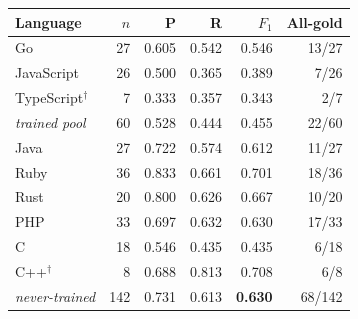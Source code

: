 \begin{tabular}{@{}lrrrrr@{}}
\toprule
Language & $n$ & P & R & $F_1$ & All-gold \\
\midrule
Go                  & 27 & 0.605 & 0.542 & 0.546 & 13/27 \\
JavaScript          & 26 & 0.500 & 0.365 & 0.389 & \phantom{0}7/26 \\
TypeScript$^{\dagger}$ & \phantom{0}7 & 0.333 & 0.357 & 0.343 & \phantom{0}2/7 \\
\addlinespace
\emph{trained pool} & 60 & 0.528 & 0.444 & 0.455 & 22/60 \\
\midrule
Java                & 27 & 0.722 & 0.574 & 0.612 & 11/27 \\
Ruby                & 36 & 0.833 & 0.661 & 0.701 & 18/36 \\
Rust                & 20 & 0.800 & 0.626 & 0.667 & 10/20 \\
PHP                 & 33 & 0.697 & 0.632 & 0.630 & 17/33 \\
C                   & 18 & 0.546 & 0.435 & 0.435 & \phantom{0}6/18 \\
C++$^{\dagger}$     & \phantom{0}8 & 0.688 & 0.813 & 0.708 & \phantom{0}6/8 \\
\addlinespace
\emph{never-trained} & 142 & 0.731 & 0.613 & \textbf{0.630} & 68/142 \\
\bottomrule
\end{tabular}
